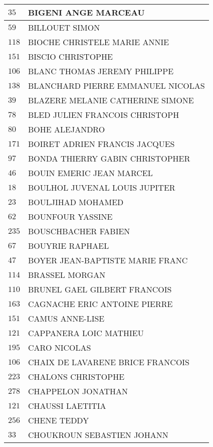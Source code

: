 \begin{xltabular}{\linewidth}{|l|X|}
    \hline
    $35$ & BIGENI ANGE MARCEAU \\
    \hline
    $59$ & BILLOUET SIMON \\
    \hline
    $118$ & BIOCHE CHRISTELE MARIE ANNIE \\
    \hline
    $151$ & BISCIO CHRISTOPHE \\
    \hline
    $106$ & BLANC THOMAS JEREMY PHILIPPE \\
    \hline
    $138$ & BLANCHARD PIERRE EMMANUEL NICOLAS \\
    \hline
    $39$ & BLAZERE MELANIE CATHERINE SIMONE \\
    \hline
    $78$ & BLED JULIEN FRANCOIS CHRISTOPH \\
    \hline
    $80$ & BOHE ALEJANDRO \\
    \hline
    $171$ & BOIRET ADRIEN FRANCIS JACQUES \\
    \hline
    $97$ & BONDA THIERRY GABIN CHRISTOPHER \\
    \hline
    $46$ & BOUIN EMERIC JEAN MARCEL \\
    \hline
    $18$ & BOULHOL JUVENAL LOUIS JUPITER \\
    \hline
    $23$ & BOULJIHAD MOHAMED \\
    \hline
    $62$ & BOUNFOUR YASSINE \\
    \hline
    $235$ & BOUSCHBACHER FABIEN \\
    \hline
    $67$ & BOUYRIE RAPHAEL \\
    \hline
    $47$ & BOYER JEAN-BAPTISTE MARIE FRANC \\
    \hline
    $114$ & BRASSEL MORGAN \\
    \hline
    $110$ & BRUNEL GAEL GILBERT FRANCOIS \\
    \hline
    $163$ & CAGNACHE ERIC ANTOINE PIERRE \\
    \hline
    $151$ & CAMUS ANNE-LISE \\
    \hline
    $121$ & CAPPANERA LOIC MATHIEU \\
    \hline
    $195$ & CARO NICOLAS \\
    \hline
    $106$ & CHAIX DE LAVARENE BRICE FRANCOIS \\
    \hline
    $223$ & CHALONS CHRISTOPHE \\
    \hline
    $278$ & CHAPPELON JONATHAN \\
    \hline
    $121$ & CHAUSSI LAETITIA \\
    \hline
    $256$ & CHENE TEDDY \\
    \hline
    $33$ & CHOUKROUN SEBASTIEN JOHANN \\

\end{xltabular}
